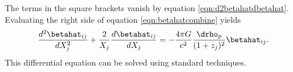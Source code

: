 The terms in the square brackets vanish by equation \ref{eqn:d2betahatdbetahat}. Evaluating the right side of equation \ref{eqn:betahatcombine} yields
\begin{equation}
\frac{d^2 \betahat_{i j}}{d X_j^2} + \frac{2}{X_j}\frac{d \betahat_{i j}}{d X_j} = - \frac{4 \pi G}{c^2} \frac{\drho_p}{(1 + z_j)^2} \betahat_{i j}.
\end{equation}
This differential equation can be solved using standard techniques.

